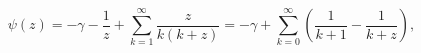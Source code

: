 \[\psi\left(z\right)=-\gamma-\frac{1}{z}+\sum_{k=1}^{\infty}\frac{z}{k(k+z)}=-%
\gamma+\sum_{k=0}^{\infty}\left(\frac{1}{k+1}-\frac{1}{k+z}\right),\]